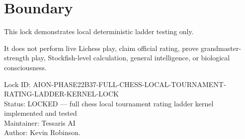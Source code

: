 \documentclass[11pt,a4paper]{article}
\begin{document}
\section{Boundary}

This lock demonstrates local deterministic ladder testing only.

It does not perform live Lichess play, claim official rating, prove grandmaster-strength play, Stockfish-level calculation, general intelligence, or biological consciousness.

\bigskip

\noindent
Lock ID: AION-PHASE22B37-FULL-CHESS-LOCAL-TOURNAMENT-RATING-LADDER-KERNEL-LOCK\\
Status: LOCKED --- full chess local tournament rating ladder kernel implemented and tested\\
Maintainer: Tessaris AI\\
Author: Kevin Robinson.
\end{document}

